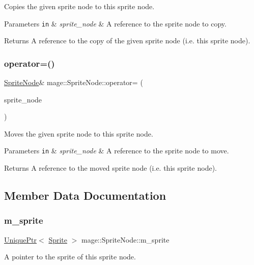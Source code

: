 Copies the given sprite node to this sprite node.


\begin{DoxyParams}[1]{Parameters}
\mbox{\tt in}  & {\em sprite\+\_\+node} & A reference to the sprite node to copy. \\
\hline
\end{DoxyParams}
\begin{DoxyReturn}{Returns}
A reference to the copy of the given sprite node (i.\+e. this sprite node). 
\end{DoxyReturn}
\hypertarget{classmage_1_1_sprite_node_a908ba50d10d6573e913a8c2d785c7d69}{}\label{classmage_1_1_sprite_node_a908ba50d10d6573e913a8c2d785c7d69} 
\subsubsection{\texorpdfstring{operator=()}{operator=()}\hspace{0.1cm}{\footnotesize\ttfamily [2/2]}}
{\footnotesize\ttfamily \hyperlink{classmage_1_1_sprite_node}{Sprite\+Node}\& mage\+::\+Sprite\+Node\+::operator= (\begin{DoxyParamCaption}\item[{\hyperlink{classmage_1_1_sprite_node}{Sprite\+Node} \&\&}]{sprite\+\_\+node }\end{DoxyParamCaption})\hspace{0.3cm}{\ttfamily [delete]}}

Moves the given sprite node to this sprite node.


\begin{DoxyParams}[1]{Parameters}
\mbox{\tt in}  & {\em sprite\+\_\+node} & A reference to the sprite node to move. \\
\hline
\end{DoxyParams}
\begin{DoxyReturn}{Returns}
A reference to the moved sprite node (i.\+e. this sprite node). 
\end{DoxyReturn}


\subsection{Member Data Documentation}
\hypertarget{classmage_1_1_sprite_node_a5a330abe0fe7aca40bb4ef201e1c175c}{}\label{classmage_1_1_sprite_node_a5a330abe0fe7aca40bb4ef201e1c175c} 
\subsubsection{\texorpdfstring{m\+\_\+sprite}{m\_sprite}}
{\footnotesize\ttfamily \hyperlink{namespacemage_a3316d7143a973e37adf1110f2e80ca31}{Unique\+Ptr}$<$ \hyperlink{classmage_1_1_sprite}{Sprite} $>$ mage\+::\+Sprite\+Node\+::m\+\_\+sprite\hspace{0.3cm}{\ttfamily [private]}}

A pointer to the sprite of this sprite node. 